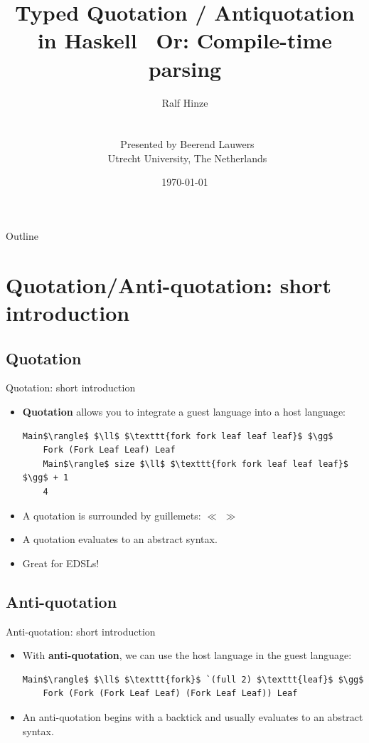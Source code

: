 \documentclass[10pt]{beamer}
\author{
	Ralf Hinze\\
	\ \\
	\ \\
	\
	Presented by Beerend Lauwers\\
	\
	Utrecht University, The Netherlands
}
\date{\today}
\title{Typed Quotation / Antiquotation in Haskell
	    \newline ~Or: Compile-time parsing}
\begin{document}
\frame{\maketitle}

\begin{frame}{Outline}
\tableofcontents
\end{frame}

\section{Quotation/Anti-quotation: short introduction}
\subsection{Quotation}
\begin{frame}[fragile]{Quotation: short introduction}

\begin{itemize}
\item \textbf{Quotation} allows you to integrate a guest language into a host language:

\begin{lstlisting}[mathescape=true]
	Main$\rangle$ $\ll$ $\texttt{fork fork leaf leaf leaf}$ $\gg$
	Fork (Fork Leaf Leaf) Leaf
	Main$\rangle$ size $\ll$ $\texttt{fork fork leaf leaf leaf}$ $\gg$ + 1 
	4
\end{lstlisting}

\item A quotation is surrounded by guillemets: $\ll$ $\gg$

\item A quotation evaluates to an abstract syntax.

\item Great for EDSLs!

\end{itemize}

\end{frame}

\subsection{Anti-quotation}
\begin{frame}[fragile]{Anti-quotation: short introduction}

\begin{itemize}
\item With \textbf{anti-quotation}, we can use the host language in the guest language:

\begin{lstlisting}[mathescape=true]
	Main$\rangle$ $\ll$ $\texttt{fork}$ `(full 2) $\texttt{leaf}$ $\gg$
	Fork (Fork (Fork Leaf Leaf) (Fork Leaf Leaf)) Leaf
\end{lstlisting}

\item An anti-quotation begins with a backtick and usually evaluates to an abstract syntax.

\end{itemize}

\end{frame}
\end{document}
